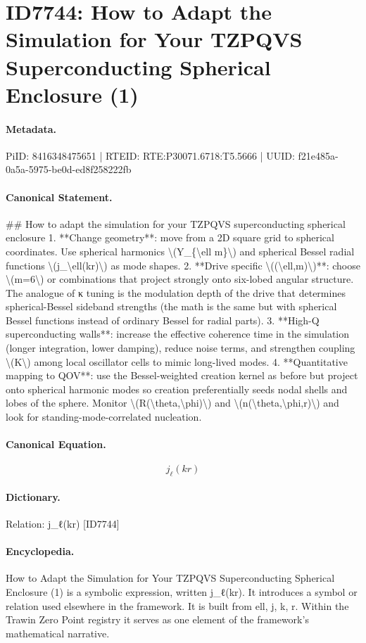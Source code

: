 \section*{ID7744: How to Adapt the Simulation for Your TZPQVS Superconducting Spherical Enclosure (1)}
\paragraph{Metadata.}
PiID: 8416348475651 | RTEID: RTE:P30071.6718:T5.5666 | UUID: f21e485a-0a5a-5975-be0d-ed8f258222fb

\paragraph{Canonical Statement.}
\#\# How to adapt the simulation for your TZPQVS superconducting spherical enclosure 1. **Change geometry**: move from a 2D square grid to spherical coordinates. Use spherical harmonics \textbackslash{}(Y\_\{\textbackslash{}ell m\}\textbackslash{}) and spherical Bessel radial functions \textbackslash{}(j\_\textbackslash{}ell(kr)\textbackslash{}) as mode shapes. 2. **Drive specific \textbackslash{}((\textbackslash{}ell,m)\textbackslash{})**: choose \textbackslash{}(m=6\textbackslash{}) or combinations that project strongly onto six-lobed angular structure. The analogue of κ tuning is the modulation depth of the drive that determines spherical-Bessel sideband strengths (the math is the same but with spherical Bessel functions instead of ordinary Bessel for radial parts). 3. **High-Q superconducting walls**: increase the effective coherence time in the simulation (longer integration, lower damping), reduce noise terms, and strengthen coupling \textbackslash{}(K\textbackslash{}) among local oscillator cells to mimic long-lived modes. 4. **Quantitative mapping to QOV**: use the Bessel-weighted creation kernel as before but project onto spherical harmonic modes so creation preferentially seeds nodal shells and lobes of the sphere. Monitor \textbackslash{}(R(\textbackslash{}theta,\textbackslash{}phi)\textbackslash{}) and \textbackslash{}(n(\textbackslash{}theta,\textbackslash{}phi,r)\textbackslash{}) and look for standing-mode-correlated nucleation.

\paragraph{Canonical Equation.}
\[
j_\ell(kr)
\]

\paragraph{Dictionary.}
Relation: j\_ℓ(kr) [ID7744]

\paragraph{Encyclopedia.}
How to Adapt the Simulation for Your TZPQVS Superconducting Spherical Enclosure (1) is a symbolic expression, written j\_ℓ(kr). It introduces a symbol or relation used elsewhere in the framework. It is built from ell, j, k, r. Within the Trawin Zero Point registry it serves as one element of the framework's mathematical narrative.

